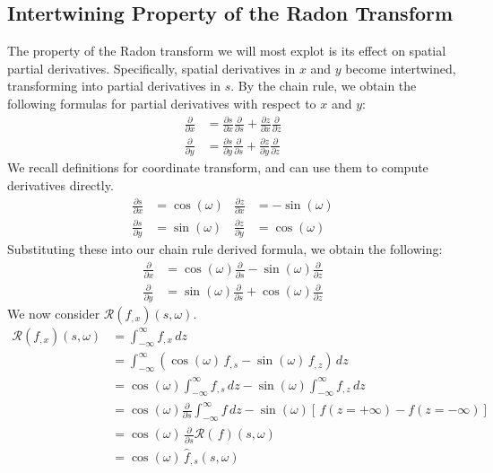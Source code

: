 \subsection{Intertwining Property of the Radon Transform}
The property of the Radon transform we will most explot is its effect on spatial partial derivatives.
Specifically, spatial derivatives in $x$ and $y$ become intertwined, transforming into partial derivatives in $s$.
By the chain rule, we obtain the following formulas for partial derivatives with respect to $x$ and $y$:
\begin{align*}
	\frac{\partial}{\partial x} & = \frac{\partial s}{\partial x} \frac{\partial}{\partial s} + \frac{\partial z}{\partial x} \frac{\partial}{\partial z} \\
	\frac{\partial}{\partial y} & = \frac{\partial s}{\partial y} \frac{\partial}{\partial s} + \frac{\partial z}{\partial y} \frac{\partial}{\partial z}
\end{align*}
We recall definitions for coordinate transform, and can use them to compute derivatives directly.
\begin{align*}
    \frac{\partial s}{\partial x} & = \cos \left( \omega \right) & \frac{\partial z}{\partial x} & = -\sin \left( \omega \right) \\
    \frac{\partial s}{\partial y} & = \sin \left( \omega \right) & \frac{\partial z}{ \partial y} & = \cos \left( \omega \right)
\end{align*}
Substituting these into our chain rule derived formula, we obtain the following:
\begin{align*}
	\frac{\partial}{\partial x} & = \cos \left( \omega \right) \frac{\partial}{\partial s} -\sin \left( \omega \right) \frac{\partial}{\partial z} \\
	\frac{\partial}{\partial y} & = \sin \left( \omega \right) \frac{\partial}{\partial s} + \cos \left( \omega \right) \frac{\partial}{\partial z}
\end{align*}
We now consider $\mathcal{R} \left( f_{,x} \right) \left( s, \omega \right)$.
\begin{align*}
    \mathcal{R} \left( f_{,x} \right) \left( s, \omega \right) & = \int_{-\infty}^{\infty} f_{, x} \, dz  \\
    & = \int_{-\infty}^{\infty}  \left( \cos (\omega) \, f_{, s} - \sin (\omega) \, f_{, z} \right) \, dz \\
    & = \cos (\omega) \int_{-\infty}^{\infty} f_{, s} \, dz - \sin (\omega) \int_{-\infty}^{\infty} f_{, z} \, dz \\
    & = \cos (\omega) \frac{\partial}{\partial s} \int_{-\infty}^{\infty} f\,dz - \sin (\omega) \left[\, f \left( z = +\infty \right) - f \left(z = -\infty \right) \right] \\
    & = \cos (\omega) \, \frac{\partial}{\partial s} \mathcal{R}(\,f) \left( s, \omega \right) \\
    & = \cos (\omega) \, \widehat{f}_{,s} \left( s, \omega \right)
\end{align*}
